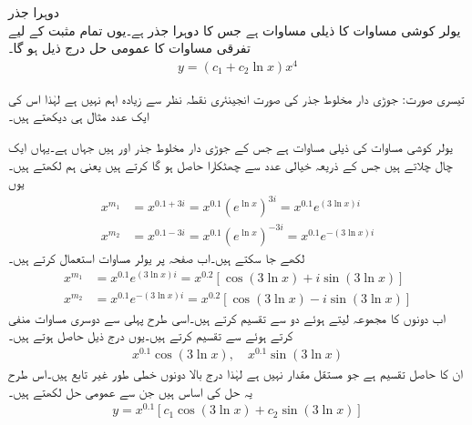 \quad دوہرا جذر\\
یولر کوشی مساوات  کا ذیلی مساوات  ہے جس کا دوہرا جذر  ہے۔یوں تمام مثبت  کے لیے تفرقی مساوات کا عمومی حل درج ذیل ہو گا۔
\begin{align*}
y=(c_1+c_2\ln x)x^4
\end{align*}


تیسری صورت: جوڑی دار مخلوط جذر کی صورت انجینئری نقطہ نظر سے زیادہ اہم نہیں ہے لہٰذا اس کی ایک عدد مثال ہی دیکھتے ہیں۔

یولر کوشی مساوات  کی   ذیلی مساوات ہے جس کے جوڑی دار مخلوط جذر  اور  ہیں جہاں  ہے۔یہاں ایک چال چلاتے ہیں جس کے ذریعہ خیالی عدد  سے چھٹکارا حاصل ہو گا کرتے ہیں یعنی ہم  لکھتے ہیں۔یوں
\begin{align*}
x^{m_1}&=x^{0.1+3i}=x^{0.1} \left(e^{\ln x}\right)^{3i}=x^{0.1}e^{(3\ln x)i}\\
x^{m_2}&=x^{0.1-3i}=x^{0.1} \left(e^{\ln x}\right)^{-3i}=x^{0.1}e^{-(3\ln x)i}
\end{align*}
لکھے جا سکتے ہیں۔اب صفحہ  پر یولر مساوات  استعمال کرتے ہیں۔
\begin{align*}
x^{m_1}&=x^{0.1}e^{(3\ln x)i}=x^{0.2}[\cos (3\ln x)+i\sin(3\ln x)]\\
x^{m_2}&=x^{0.1}e^{-(3\ln x)i}=x^{0.2}[\cos (3\ln x)-i\sin(3\ln x)]
\end{align*}
اب دونوں کا مجموعہ لیتے ہوئے دو  سے تقسیم کرتے ہیں۔اسی طرح پہلی سے دوسری مساوات منفی کرتے ہوئے  سے تقسیم کرتے ہیں۔یوں درج ذیل حاصل ہوتے ہیں۔
\begin{align*}
x^{0.1}\cos (3\ln x), \quad x^{0.1}\sin (3\ln x)
\end{align*}
ان کا حاصل تقسیم  ہے جو مستقل مقدار نہیں ہے لہٰذا درج بالا دونوں خطی طور غیر تابع ہیں۔اس طرح یہ حل کی اساس ہیں جن سے عمومی حل لکھتے ہیں۔
\begin{align*}
y=x^{0.1}[c_1 \cos (3\ln x)+c_2 \sin (3\ln x)]
\end{align*}
